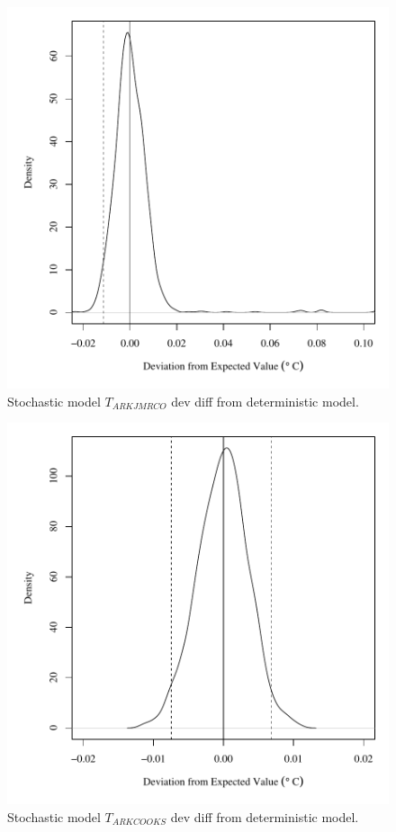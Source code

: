 \begin{center}
\begin{figure}[htbp]
	\includegraphics[width=6in]{"Figures/Results_DSR/V dev diff tin"}
	\caption{Stochastic model $T_{ARKJMRCO}$ dev diff from deterministic model.}
\end{figure}
\end{center}
\newpage

\begin{center}
\begin{figure}[htbp]
	\includegraphics[width=6in]{"Figures/Results_DSR/V dev diff tout"}
	\caption{Stochastic model $T_{ARKCOOKS}$ dev diff from deterministic model.}
\end{figure}
\end{center}
\newpage

